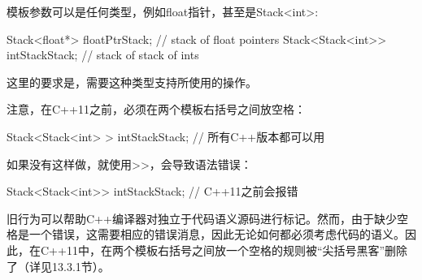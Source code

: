 模板参数可以是任何类型，例如float指针，甚至是Stack<int>:

\begin{cpp}
Stack<float*> floatPtrStack; // stack of float pointers
Stack<Stack<int>> intStackStack; // stack of stack of ints
\end{cpp}

这里的要求是，需要这种类型支持所使用的操作。

注意，在C++11之前，必须在两个模板右括号之间放空格：

\begin{cpp}
Stack<Stack<int> > intStackStack; // 所有C++版本都可以用
\end{cpp}

如果没有这样做，就使用>{}>，会导致语法错误：

\begin{cpp}
Stack<Stack<int>> intStackStack; // C++11之前会报错
\end{cpp}

旧行为可以帮助C++编译器对独立于代码语义源码进行标记。然而，由于缺少空格是一个错误，这需要相应的错误消息，因此无论如何都必须考虑代码的语义。因此，在C++11中，在两个模板右括号之间放一个空格的规则被“尖括号黑客”删除了（详见13.3.1节）。





















